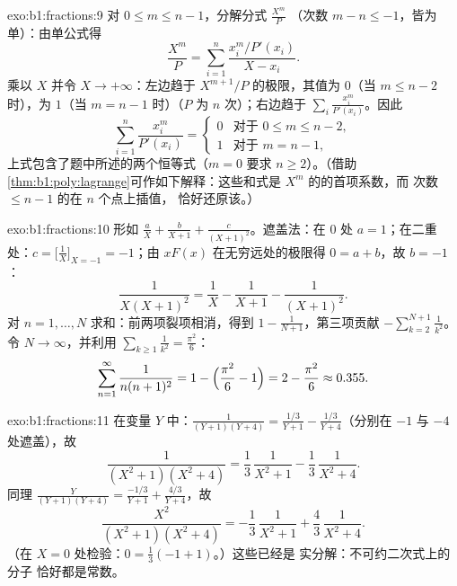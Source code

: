 \begin{solution}{exo:b1:fractions:9}
对 $0 \leq m \leq n - 1$，分解分式 $\frac{X^m}{P}$
（次数 $m - n \leq -1$，皆为单）：由单公式得
\[
\frac{X^m}{P} = \sum_{i=1}^{n} \frac{x_i^m / P'(x_i)}{X - x_i} .
\]
乘以 $X$ 并令 $X \to +\infty$：左边趋于
$X^{m+1}/P$ 的极限，其值为 $0$（当 $m \leq n - 2$ 时），为 $1$（当 $m =
n - 1$ 时）（$P$ 为 $n$ 次）；右边趋于
$\sum_i \frac{x_i^m}{P'(x_i)}$。因此
\[
\sum_{i=1}^{n} \frac{x_i^{m}}{P'(x_i)} =
\begin{cases}
0 & \text{对于 } 0 \leq m \leq n-2,\\
1 & \text{对于 } m = n - 1,
\end{cases}
\]
上式包含了题中所述的两个恒等式（$m = 0$ 要求 $n \geq
2$）。（借助\cref{thm:b1:poly:lagrange}可作如下解释：这些和式是
$X^m$ 的的首项系数，而
次数 $\leq n-1$ 的在 $n$ 个点上插值，
恰好还原该。）
\end{solution}

\begin{solution}{exo:b1:fractions:10}
形如 $\frac aX + \frac b{X+1} + \frac c{(X+1)^2}$。遮盖法：在
$0$ 处 $a = 1$；在二重处：$c = \bigl[\frac1X
\bigr]_{X=-1} = -1$；由 $xF(x)$ 在无穷远处的极限得 $0 = a + b$，故
$b = -1$：
\[
\frac{1}{X(X+1)^2} = \frac1X - \frac1{X+1} - \frac1{(X+1)^2} .
\]
对 $n = 1, \dots, N$ 求和：前两项裂项相消，得到
$1 - \frac1{N+1}$，第三项贡献 $-\sum_{k=2}^{N+1}
\frac1{k^2}$。令 $N \to \infty$，并利用 $\sum_{k\geq1}
\frac1{k^2} = \frac{\pi^2}6$：
\[
\sum_{n=1}^{\infty}\frac{1}{n(n+1)^2}
= 1 - \Bigl(\frac{\pi^2}6 - 1\Bigr) = 2 - \frac{\pi^2}6
\approx 0.355 .
\]
\end{solution}

\begin{solution}{exo:b1:fractions:11}
在变量 $Y$ 中：$\frac1{(Y+1)(Y+4)} = \frac{1/3}{Y+1} -
\frac{1/3}{Y+4}$（分别在 $-1$ 与 $-4$ 处遮盖），故
\[
\frac{1}{(X^2+1)(X^2+4)}
= \frac13\,\frac1{X^2+1} - \frac13\,\frac1{X^2+4} .
\]
同理 $\frac{Y}{(Y+1)(Y+4)} = \frac{-1/3}{Y+1} +
\frac{4/3}{Y+4}$，故
\[
\frac{X^2}{(X^2+1)(X^2+4)}
= -\frac13\,\frac1{X^2+1} + \frac43\,\frac1{X^2+4} .
\]
（在 $X = 0$ 处检验：$0 = \frac13(-1 + 1)$。）这些已经是
实分解：不可约二次式上的分子
恰好都是常数。
\end{solution}

